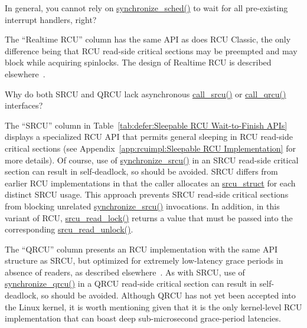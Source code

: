 \QuickQuiz{}
	In general, you cannot rely on \url{synchronize_sched()} to
	wait for all pre-existing interrupt handlers,
	right?
 \QuickQuizEnd

The ``Realtime RCU'' column has the same API as does
RCU Classic, the only difference being that RCU read-side critical
sections may be preempted and may block while acquiring spinlocks.
The design of Realtime RCU is described
elsewhere~\cite{PaulEMcKenney2007PreemptibleRCU}.

\QuickQuiz{}
	Why do both SRCU and QRCU lack asynchronous \url{call_srcu()}
	or \url{call_qrcu()} interfaces?
 \QuickQuizEnd

The ``SRCU'' column in
Table~\ref{tab:defer:Sleepable RCU Wait-to-Finish APIs}
displays a specialized RCU API that permits
general sleeping in RCU read-side critical sections
(see Appendix~\ref{app:rcuimpl:Sleepable RCU Implementation} for more details).
Of course,
use of \url{synchronize_srcu()} in an SRCU read-side
critical section can result in
self-deadlock, so should be avoided.
SRCU differs from earlier RCU implementations in that the caller
allocates an \url{srcu_struct} for each distinct SRCU
usage.
This approach prevents SRCU read-side critical sections from blocking
unrelated \url{synchronize_srcu()} invocations.
In addition, in this variant of RCU, \url{srcu_read_lock()}
returns a value that must be passed into the corresponding
\url{srcu_read_unlock()}.

The ``QRCU'' column presents an RCU implementation with the same
API structure as SRCU, but optimized for extremely low-latency
grace periods in absence of readers, as described
elsewhere~\cite{PaulEMcKenney2007QRCUspin}.
As with SRCU, use of \url{synchronize_qrcu()} in a QRCU read-side
critical section can result in
self-deadlock, so should be avoided.
Although QRCU has not yet been accepted into the Linux kernel, it
is worth mentioning given that it is the only kernel-level
RCU implementation
that can boast deep sub-microsecond grace-period latencies.

